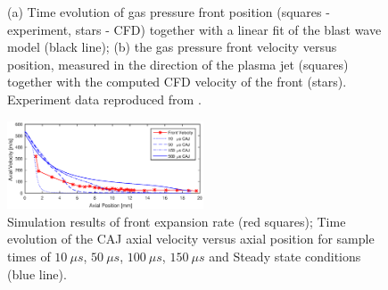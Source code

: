 \documentclass[a4paper]{iacas}%
\begin{document}
\begin{figure}
	\centering
	\caption{(a) Time evolution of gas pressure front position (squares - experiment, stars - CFD) together with a linear fit of the blast wave model (black line); (b) the gas pressure front velocity versus position, measured in the direction of the plasma jet (squares) together with the computed CFD velocity of the front (stars). Experiment data reproduced from \cite{KR}.}
	\label{fig:model_blast}
\end{figure}
\begin{figure}
	\centering
	\includegraphics[width=0.52\textwidth]{Vel_Times.eps}
	\caption{Simulation results of front expansion rate (red squares); Time evolution of the CAJ axial velocity versus axial position for sample times of $10~\mu s$, $50~\mu s$, $100~\mu s$, $150~\mu s$ and Steady state conditions (blue line).}
	\label{fig:model_caj_velocity}
\end{figure}
\end{document}
